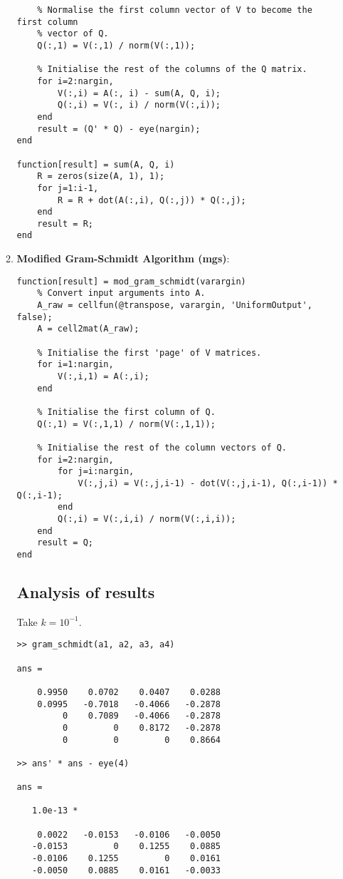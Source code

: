 \documentclass{article}
\begin{document}
\begin{enumerate}
\begin{enumerate}
\begin{verbatim}
    % Normalise the first column vector of V to become the first column
    % vector of Q.
    Q(:,1) = V(:,1) / norm(V(:,1));
    
    % Initialise the rest of the columns of the Q matrix.
    for i=2:nargin,
        V(:,i) = A(:, i) - sum(A, Q, i);
        Q(:,i) = V(:, i) / norm(V(:,i));
    end
    result = (Q' * Q) - eye(nargin);
end

function[result] = sum(A, Q, i)
    R = zeros(size(A, 1), 1);
    for j=1:i-1,
        R = R + dot(A(:,i), Q(:,j)) * Q(:,j);
    end    
    result = R;
end
    \end{verbatim}
    \item \textbf{Modified Gram-Schmidt Algorithm (mgs)}:
    \begin{verbatim}
function[result] = mod_gram_schmidt(varargin)
    % Convert input arguments into A.
    A_raw = cellfun(@transpose, varargin, 'UniformOutput', false);  
    A = cell2mat(A_raw);
    
    % Initialise the first 'page' of V matrices.
    for i=1:nargin,
        V(:,i,1) = A(:,i);
    end
    
    % Initialise the first column of Q.
    Q(:,1) = V(:,1,1) / norm(V(:,1,1));
    
    % Initialise the rest of the column vectors of Q.
    for i=2:nargin,
        for j=i:nargin,
            V(:,j,i) = V(:,j,i-1) - dot(V(:,j,i-1), Q(:,i-1)) * Q(:,i-1);
        end
        Q(:,i) = V(:,i,i) / norm(V(:,i,i));
    end    
    result = Q;
end

    \end{verbatim}
    \subsection*{Analysis of results}
    Take $k = 10^{-1}$.
    \begin{verbatim}
>> gram_schmidt(a1, a2, a3, a4)

ans =

    0.9950    0.0702    0.0407    0.0288
    0.0995   -0.7018   -0.4066   -0.2878
         0    0.7089   -0.4066   -0.2878
         0         0    0.8172   -0.2878
         0         0         0    0.8664
         
>> ans' * ans - eye(4)

ans =

   1.0e-13 *

    0.0022   -0.0153   -0.0106   -0.0050
   -0.0153         0    0.1255    0.0885
   -0.0106    0.1255         0    0.0161
   -0.0050    0.0885    0.0161   -0.0033
         

\end{verbatim}
\end{enumerate}
\end{enumerate}
\end{document}
